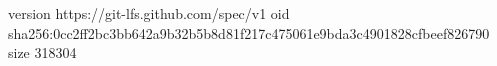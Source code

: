 version https://git-lfs.github.com/spec/v1
oid sha256:0cc2ff2bc3bb642a9b32b5b8d81f217c475061e9bda3c4901828cfbeef826790
size 318304
